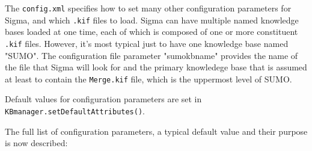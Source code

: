 \documentclass{book}
\begin{document}
The \texttt{config.xml} specifies how to set many other configuration parameters
for Sigma, and which \texttt{.kif} files to load.  Sigma can have multiple named
knowledge bases loaded at one time, each of which is composed of one or more
constituent \texttt{.kif} files.  However, it's most typical just to have one
knowledge base named "SUMO".  The configuration file parameter "sumokbname" provides
the name of the file that Sigma will look for and the primary knowledege base that
is assumed at least to contain the \texttt{Merge.kif} file, which is the uppermost
level of SUMO.

\begin{sloppypar}
Default values for configuration parameters are set in 
\texttt{KBmanager.setDefaultAttributes()}.
\end{sloppypar}

The full list of configuration parameters, a typical default value and their
purpose is now described:
\end{document}
